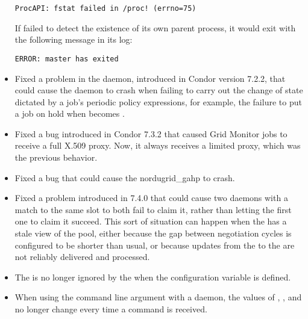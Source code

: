 \begin{itemize}
\begin{verbatim}
ProcAPI: fstat failed in /proc! (errno=75)
\end{verbatim}

If  failed to detect the existence of its own parent process,
it would exit with the following message in its log:

\begin{verbatim}
ERROR: master has exited
\end{verbatim}

\item Fixed a problem in the  daemon,
  introduced in Condor version 7.2.2,
  that could cause the daemon to crash when failing to carry out the change
  of state dictated by a job's periodic policy expressions,
  for example, the failure to put a job on hold when 
  becomes .

\item Fixed a bug introduced in Condor 7.3.2 that caused Grid Monitor
jobs to receive a full X.509 proxy. Now, it always receives a limited
proxy, which was the previous behavior.

\item Fixed a bug that could cause the nordugrid\_gahp to crash.

\item Fixed a problem introduced in 7.4.0 that could cause two 
   daemons
  with a match to the same slot to both fail to claim it, rather than
  letting the first one to claim it succeed.  This sort of situation
  can happen when the  has a stale view of the pool,
  either because the gap between negotiation cycles is configured to
  be shorter than usual, or because updates from the 
  to the 
  are not reliably delivered and processed.

\item The  is no longer ignored by the 
when the configuration variable  is defined.

\item When using the  command line argument with a daemon,
the values of , , and 
no longer change every time a  command is received.

\end{itemize}

